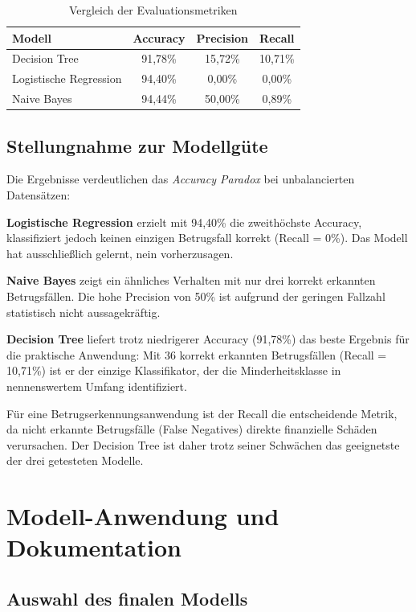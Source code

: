 \begin{table}[H]
\centering
\begin{tabular}{l|ccc}
\textbf{Modell} & \textbf{Accuracy} & \textbf{Precision} & \textbf{Recall} \\
\hline
Decision Tree & 91,78\% & 15,72\% & 10,71\% \\
Logistische Regression & 94,40\% & 0,00\% & 0,00\% \\
Naive Bayes & 94,44\% & 50,00\% & 0,89\% \\
\end{tabular}
\caption{Vergleich der Evaluationsmetriken}
\end{table}

\subsection{Stellungnahme zur Modellgüte}

Die Ergebnisse verdeutlichen das \textit{Accuracy Paradox} bei unbalancierten Datensätzen:

\textbf{Logistische Regression} erzielt mit 94,40\% die zweithöchste Accuracy, 
klassifiziert jedoch keinen einzigen Betrugsfall korrekt (Recall = 0\%). 
Das Modell hat ausschließlich gelernt, \glqq nein\grqq{} vorherzusagen.

\textbf{Naive Bayes} zeigt ein ähnliches Verhalten mit nur drei korrekt erkannten 
Betrugsfällen. Die hohe Precision von 50\% ist aufgrund der geringen Fallzahl 
statistisch nicht aussagekräftig.

\textbf{Decision Tree} liefert trotz niedrigerer Accuracy (91,78\%) das beste 
Ergebnis für die praktische Anwendung: Mit 36 korrekt erkannten Betrugsfällen 
(Recall = 10,71\%) ist er der einzige Klassifikator, der die Minderheitsklasse 
in nennenswertem Umfang identifiziert.

Für eine Betrugserkennungsanwendung ist der Recall die entscheidende Metrik, 
da nicht erkannte Betrugsfälle (False Negatives) direkte finanzielle Schäden 
verursachen. Der Decision Tree ist daher trotz seiner Schwächen das geeignetste 
der drei getesteten Modelle.

\section{Modell-Anwendung und Dokumentation}

\subsection{Auswahl des finalen Modells}

